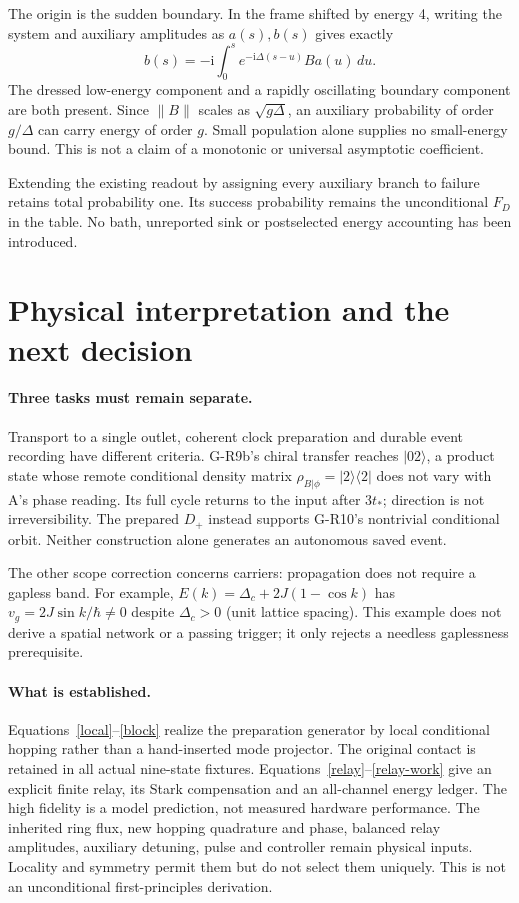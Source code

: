 \documentclass[11pt,a4paper]{article}
\newcommand{\ii}{\mathrm i}
\newcommand{\ket}[1]{|#1\rangle}
\newcommand{\bra}[1]{\langle#1|}
\begin{document}
The origin is the sudden boundary. In the frame shifted by energy 4,
writing the system and auxiliary amplitudes as $a(s),b(s)$ gives exactly
\begin{equation}
 b(s)=-\ii\int_0^s e^{-\ii\Delta(s-u)}B a(u)\,du.
\end{equation}
The dressed low-energy component and a rapidly oscillating boundary
component are both present. Since $\|B\|$ scales as $\sqrt{g\Delta}$,
an auxiliary probability of order $g/\Delta$ can carry energy of order
$g$. Small population alone supplies no small-energy bound. This is
not a claim of a monotonic or universal asymptotic coefficient.

Extending the existing readout by assigning every auxiliary branch to
failure retains total probability one. Its success probability remains
the unconditional $F_D$ in the table. No bath, unreported sink or
postselected energy accounting has been introduced.

\newpage
\section{Physical interpretation and the next decision}
\paragraph{Three tasks must remain separate.}
Transport to a single outlet, coherent clock preparation and durable
event recording have different criteria. G-R9b's chiral transfer reaches
$\ket{02}$, a product state whose remote conditional density matrix
$\rho_{B|\phi}=\ket2\bra2$ does not vary with A's phase reading. Its full
cycle returns to the input after $3t_*$; direction is not irreversibility.
The prepared $D_+$ instead supports G-R10's nontrivial conditional orbit.
Neither construction alone generates an autonomous saved event.

The other scope correction concerns carriers: propagation does not
require a gapless band. For example,
$E(k)=\Delta_c+2J(1-\cos k)$ has $v_g=2J\sin k/\hbar\ne0$ despite
$\Delta_c>0$ (unit lattice spacing). This example does not derive a
spatial network or a passing trigger; it only rejects a needless
gaplessness prerequisite.

\paragraph{What is established.}
Equations~\eqref{local}--\eqref{block} realize the preparation generator
by local conditional hopping rather than a hand-inserted mode projector.
The original contact is retained in all actual nine-state fixtures.
Equations~\eqref{relay}--\eqref{relay-work} give an explicit finite relay,
its Stark compensation and an all-channel energy ledger. The high
fidelity is a model prediction, not measured hardware performance.
The inherited ring flux, new hopping quadrature and phase, balanced
relay amplitudes, auxiliary detuning, pulse and controller remain
physical inputs. Locality and symmetry permit them but do not select
them uniquely. This is not an unconditional first-principles derivation.
\end{document}

